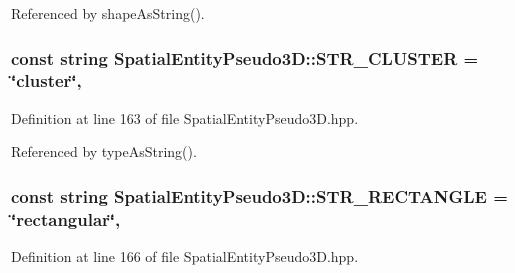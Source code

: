 Referenced by shape\-As\-String().

\hypertarget{classmultiscale_1_1analysis_1_1SpatialEntityPseudo3D_aa7104d49e4b42c312a942c4795353f10}{
\subsubsection[{S\-T\-R\-\_\-\-C\-L\-U\-S\-T\-E\-R}]{\setlength{\rightskip}{0pt plus 5cm}const string Spatial\-Entity\-Pseudo3\-D\-::\-S\-T\-R\-\_\-\-C\-L\-U\-S\-T\-E\-R = \char`\"{}cluster\char`\"{}\hspace{0.3cm}{\ttfamily [static]}, {\ttfamily [protected]}}}\label{classmultiscale_1_1analysis_1_1SpatialEntityPseudo3D_aa7104d49e4b42c312a942c4795353f10}


Definition at line 163 of file Spatial\-Entity\-Pseudo3\-D.\-hpp.



Referenced by type\-As\-String().

\hypertarget{classmultiscale_1_1analysis_1_1SpatialEntityPseudo3D_a9b80a7c37a8c82fed02a1e23b1173843}{
\subsubsection[{S\-T\-R\-\_\-\-R\-E\-C\-T\-A\-N\-G\-L\-E}]{\setlength{\rightskip}{0pt plus 5cm}const string Spatial\-Entity\-Pseudo3\-D\-::\-S\-T\-R\-\_\-\-R\-E\-C\-T\-A\-N\-G\-L\-E = \char`\"{}rectangular\char`\"{}\hspace{0.3cm}{\ttfamily [static]}, {\ttfamily [protected]}}}\label{classmultiscale_1_1analysis_1_1SpatialEntityPseudo3D_a9b80a7c37a8c82fed02a1e23b1173843}


Definition at line 166 of file Spatial\-Entity\-Pseudo3\-D.\-hpp.



